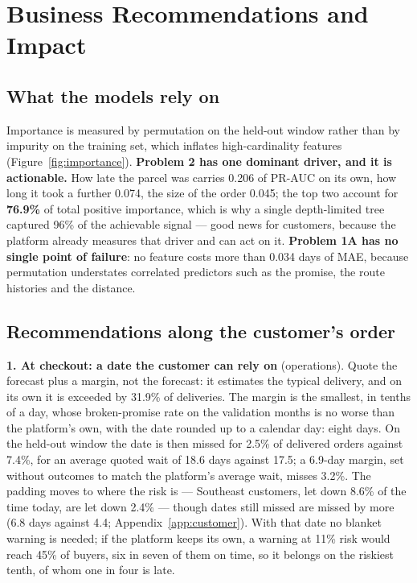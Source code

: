 \section{Business Recommendations and Impact}
\label{sec:insight}

\subsection{What the models rely on}

Importance is measured by permutation on the held-out window rather than by
impurity on the training set, which inflates high-cardinality features
\citep{strobl2007importance} (Figure~\ref{fig:importance}). \textbf{Problem 2
has one dominant driver, and it is actionable.} How late the parcel was carries
0.206 of PR-AUC on its own, how long it took a further 0.074, the size of the
order 0.045; the top two account for \textbf{76.9\%} of total positive
importance, which is why a single depth-limited tree captured 96\% of the
achievable signal --- good news for customers, because the platform already
measures that driver and can act on it. \textbf{Problem 1A has no single point
of failure}: no feature costs more than 0.034 days of MAE, because permutation
understates correlated predictors such as the promise, the route histories and
the distance.

\subsection{Recommendations along the customer's order}
\label{sec:stakeholders}

\textbf{1. At checkout: a date the customer can rely on} (operations). Quote the
forecast plus a margin, not the forecast: it estimates the typical delivery, and
on its own it is exceeded by 31.9\% of deliveries. The margin is the smallest,
in tenths of a day, whose broken-promise rate on the validation months is no
worse than the platform's own, with the date rounded up to a calendar day: eight
days. On the held-out window the date is then missed for 2.5\% of delivered
orders against 7.4\%, for an average quoted wait of 18.6 days against 17.5; a
6.9-day margin, set without outcomes to match the platform's average wait,
misses 3.2\%. The padding moves to where the risk is --- Southeast customers, let
down 8.6\% of the time today, are let down 2.4\% --- though dates still missed
are missed by more (6.8 days against 4.4; Appendix~\ref{app:customer}). With
that date no blanket warning is needed; if the platform keeps its own, a warning
at 11\% risk would reach 45\% of buyers, six in seven of them on time, so it
belongs on the riskiest tenth, of whom one in four is late.


